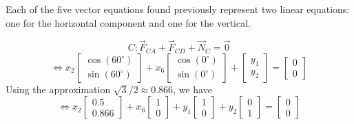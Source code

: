 \begin{remark}
Each of the five vector
equations found previously represent two linear equations:
one for the horizontal component and one for the vertical.

\drawtruss{\trussStrutVariables}

\[
C: \vec F_{CA}+\vec F_{CD}+\vec N_C=\vec 0
\]
\[
\Leftrightarrow
x_2\begin{bmatrix}\cos(60^\circ)\\\sin(60^\circ)\end{bmatrix}+
x_6\begin{bmatrix}\cos(0^\circ)\\\sin(0^\circ)\end{bmatrix}+
\begin{bmatrix}y_1\\y_2\end{bmatrix}=\begin{bmatrix}0\\0\end{bmatrix}
\]
Using the approximation \(\sqrt{3}/2\approx 0.866\), we have
\[
\Leftrightarrow
x_2\begin{bmatrix}0.5\\0.866\end{bmatrix}+
x_6\begin{bmatrix}1\\0\end{bmatrix}+
y_1\begin{bmatrix}1\\0\end{bmatrix}+
y_2\begin{bmatrix}0\\1\end{bmatrix}=
\begin{bmatrix}0\\0\end{bmatrix}
\]
\end{remark}

